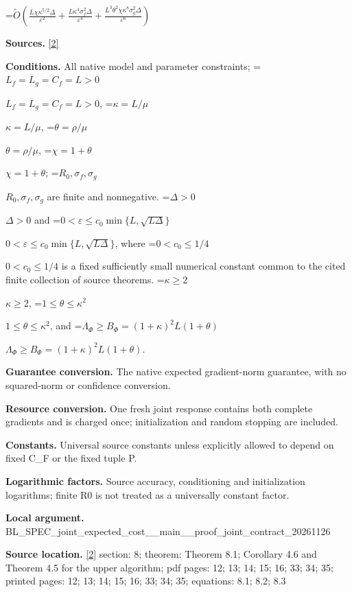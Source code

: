 \documentclass[10pt,a4paper]{article}
\newcommand{\AtlasMath}[1]{\par\begingroup\centering\setbox0=\hbox{$\displaystyle #1$}\ifdim\wd0>1.4\linewidth\typeout{ATLAS WIDE FORMULA: \the\wd0}\fi\ifdim\wd0>\linewidth\resizebox{\linewidth}{!}{\box0}\else\box0\fi\par\endgroup}
\newcommand{\AtlasInlineMath}[1]{\begingroup\setbox0=\hbox{$#1$}\ifdim\wd0>.4\linewidth\endgroup\AtlasMath{#1}\else\endgroup$#1$\fi}
\begin{document}
\AtlasMath{\widetilde O\!\left(\frac{L\chi\kappa^{5/2}\Delta}{\varepsilon^2}+\frac{L\kappa^4\sigma_f^2\Delta}{\varepsilon^4}+\frac{L^3\theta^2\chi\kappa^8\sigma_g^2\Delta}{\varepsilon^6}\right)}


\textbf{Sources.} \href{https://github.com/WU-Wendao/Colombo/blob/main/colombo_sensorium/Complexity_altas/data/sources/colombo/SFO_JOINT_20261126/manuscript.pdf}{[2]}



\textbf{Conditions.} All native model and parameter constraints; \AtlasInlineMath{L_f=L_g=C_f=L>0}, \AtlasInlineMath{\kappa=L/\mu}, \AtlasInlineMath{\theta=\rho/\mu}, \AtlasInlineMath{\chi=1+\theta}; \AtlasInlineMath{R_0,\sigma_f,\sigma_g} are finite and nonnegative. \AtlasInlineMath{\Delta>0} and \AtlasInlineMath{0<\varepsilon\le c_0\min\{L,\sqrt{L\Delta}\}}, where \AtlasInlineMath{0<c_0\le1/4} is a fixed sufficiently small numerical constant common to the cited finite collection of source theorems. \AtlasInlineMath{\kappa\ge2}, \AtlasInlineMath{1\le\theta\le\kappa^2}, and \AtlasInlineMath{\Lambda_\Phi\ge B_\Phi=(1+\kappa)^2L(1+\theta)}.



\textbf{Guarantee conversion.} The native expected gradient-norm guarantee, with no squared-norm or confidence conversion.



\textbf{Resource conversion.} One fresh joint response contains both complete gradients and is charged once; initialization and random stopping are included.



\textbf{Constants.} Universal source constants unless explicitly allowed to depend on fixed C\_F or the fixed tuple P.



\textbf{Logarithmic factors.} Source accuracy, conditioning and initialization logarithms; finite R0 is not treated as a universally constant factor.



\textbf{Local argument.} BL\_SPEC\_joint\_expected\_c\allowbreak{}ost\_\_main\_\_proof\_joint\_c\allowbreak{}ontract\_20261126



\textbf{Source location.} \href{https://github.com/WU-Wendao/Colombo/blob/main/colombo_sensorium/Complexity_altas/data/sources/colombo/SFO_JOINT_20261126/manuscript.pdf}{[2]} section: 8; theorem: Theorem 8.1; Corollary 4.6 and Theorem 4.5 for the upper algorithm; pdf pages: 12; 13; 14; 15; 16; 33; 34; 35; printed pages: 12; 13; 14; 15; 16; 33; 34; 35; equations: 8.1; 8.2; 8.3
\end{document}
